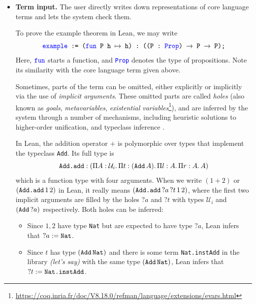 \documentclass[twoside]{report}
\begin{document}
\begin{itemize}
    \item \textbf{Term input.} The user directly writes down representations of core language terms and lets the system check them.

          \begin{example}
              To prove the example theorem in Lean, we may write
              $$\texttt{\textcolor{blue}{example} := (\textcolor{blue}{fun} P h $\mapsto$ h) :\ ((P : \textcolor{blue}{Prop}) $\rightarrow$ P $\rightarrow$ P);}$$
              Here, $\texttt{\textcolor{blue}{fun}}$ starts a function, and \texttt{\textcolor{blue}{Prop}} denotes the type of propositions. Note its similarity with the core language term given above.
          \end{example}

          Sometimes, parts of the term can be omitted, either explicitly or implicitly via the use of \emph{implicit arguments}. These omitted parts are called \emph{holes} (also known as \emph{goals}, \emph{metavariables}, \emph{existential variables}\footnote{\url{https://coq.inria.fr/doc/V8.18.0/refman/language/extensions/evars.html}}), and are inferred by the system through a number of mechanisms, including heuristic solutions to higher-order unification, and typeclass inference \cite{de2015lean,mahboubi2013canonical}.

          \begin{example}
              In Lean, the addition operator $+$ is polymorphic over types that implement the typeclass \texttt{Add}. Its full type is $$\texttt{Add.add} : (\Pi{A} : {\mathcal U_i}.\,{\Pi{t} : {({\texttt{Add}}\,{A})}.\,{\Pi{l} : {A}.\,{\Pi{r} : {A}.\,{A}}}})$$ which is a function type with four arguments. When we write $(1 + 2)$ or $({{\texttt{Add.add}}\,{1}}\,{2})$ in Lean, it really means $({{{{\texttt{Add.add}}\,{?a}}\,{?t}}\,{1}}\,{2})$, where the first two implicit arguments are filled by the holes ${?a}$ and ${?t}$ with types ${\mathcal U_i}$ and $({\texttt{Add}}\,{?a})$ respectively. Both holes can be inferred:
              \begin{itemize}
                  \item Since $1, 2$ have type \texttt{Nat} but are expected to have type ${?a}$, Lean infers that ${?a} := \texttt{Nat}$.
                  \item Since $t$ has type $({\texttt{Add}}\,{\texttt{Nat}})$ and there is some term \texttt{Nat.instAdd} in the library \emph{(let's say)} with the same type $({\texttt{Add}}\,{\texttt{Nat}})$, Lean infers that ${?t} := \texttt{Nat.instAdd}$.
              \end{itemize}
          \end{example}


\end{itemize}
\end{document}
